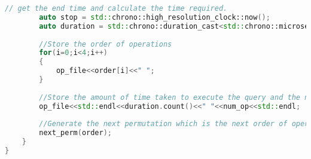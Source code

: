 \begin{lstlisting}[language=C++, caption=The SegToll query which will generate data for DQNs, label={lst:SegToll}]
        // get the end time and calculate the time required.
        auto stop = std::chrono::high_resolution_clock::now(); 
        auto duration = std::chrono::duration_cast<std::chrono::microseconds>(stop - start);
        
        //Store the order of operations
        for(i=0;i<4;i++)
        {
            op_file<<order[i]<<" ";
        }
        
        //Store the amount of time taken to execute the query and the number of operations required.
        op_file<<std::endl<<duration.count()<<" "<<num_op<<std::endl;
        
        //Generate the next permutation which is the next order of operations to try.
        next_perm(order);
    }
}
\end{lstlisting}

